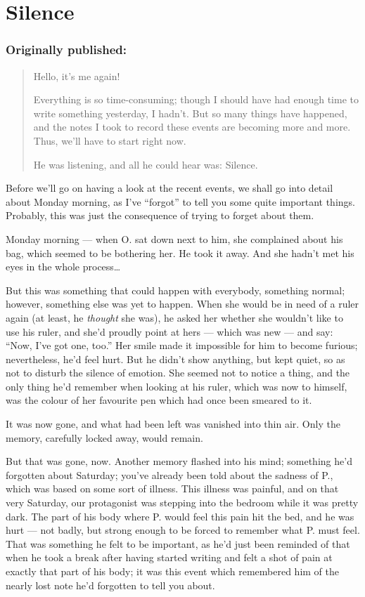 \chapter{Silence}
\label{cha:silence}
\subsection*{Originally published: }
\begin{quote}
Hello, it's me again!

Everything is so time-consuming; though I should have had enough time to write something yesterday, I hadn't. But so many things have happened, and the notes I took to record these events are becoming more and more. 
Thus, we'll have to start right now.

He was listening, and all he could hear was: Silence.
\end{quote}

Before we'll go on having a look at the recent events, we shall go into detail about Monday morning, as I've \enquote{forgot} to tell you some quite important things. Probably, this was just the consequence of trying to forget about them.

Monday morning --- when O. sat down next to him, she complained about his bag, which seemed to be bothering her. He took it away. And she hadn't met his eyes in the whole process\dots{}

But this was something that could happen with everybody, something normal; however, something else was yet to happen. When she would be in need of a ruler again (at least, he \emph{thought} she was), he asked her whether she wouldn't like to use his ruler, and she'd proudly point at hers --- which was new --- and say: \enquote{Now, I've got one, too.} Her smile made it impossible for him to become furious; nevertheless, he'd feel hurt. But he didn't show anything, but kept quiet, so as not to disturb the silence of emotion. She seemed not to notice a thing, and the only thing he'd remember when looking at his ruler, which was now to himself, was the colour of her favourite pen which had once been smeared to it.

It was now gone, and what had been left was vanished into thin air. Only the memory, carefully locked away, would remain.

But that was gone, now. Another memory flashed into his mind; something he'd forgotten about Saturday; you've already been told about the sadness of P., which was based on some sort of illness. This illness was painful, and on that very Saturday, our protagonist was stepping into the bedroom while it was pretty dark. The part of his body where P. would feel this pain hit the bed, and he was hurt --- not badly, but strong enough to be forced to remember what P. must feel. That was something he felt to be important, as he'd just been reminded of that when he took a break after having started writing and felt a shot of pain at exactly that part of his body; it was this event which remembered him of the nearly lost note he'd forgotten to tell you about.

